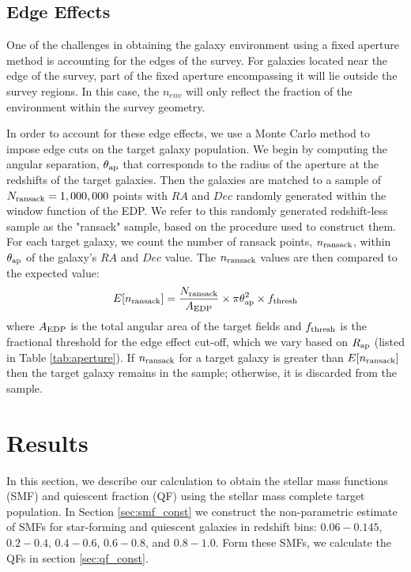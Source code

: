 \documentclass{emulateapj}
\begin{document}
\subsection{Edge Effects} \label{sec:edgeeffect}
One of the challenges in obtaining the galaxy environment using a fixed aperture method is accounting for the edges of the survey.
For galaxies located near the edge of the survey, part of the fixed aperture encompassing it will lie outside the survey regions. 
In this case, the $n_{env}$ will only reflect the fraction of the environment within the survey geometry.

In order to account for these edge effects, we use a Monte Carlo method to impose edge cuts on the target 
galaxy population. 
We begin by computing the angular separation, $\theta_{\rm{ap}}$ that corresponds to the radius of the 
aperture at the redshifts of the target galaxies.
Then the galaxies are matched to a sample of $N_{\rm{ransack}}=1,000,000$ points with $RA$ and $Dec$
 randomly generated within the window function of the EDP.  
We refer to this randomly generated redshift-less sample as the "ransack" sample, based on the procedure 
used to construct them. 
For each target galaxy, we count the number of ransack points, $n_{\rm{ransack}}$, within $\theta_{\rm{ap}}$
of the galaxy's $RA$ and $Dec$ value.
The $n_{\rm{ransack}}$ values are then compared to the expected value:
\begin{equation} \label{eq:ransack}
E[n_{\rm{ransack}}] = \frac{N_{\rm{ransack}}}{A_{\rm{EDP}}}\times {\pi \theta_{\rm{ap}}^2} \times f_{\rm{thresh}} 
\end{equation} 
where $A_{\rm{EDP}}$ is the total angular area of the target fields and $f_{\rm{thresh}}$ is the fractional 
threshold for the edge effect cut-off, which we vary based on $R_{\rm{ap}}$ (listed in Table \ref{tab:aperture}).
If $n_{\rm{ransack}}$ for a target galaxy is greater than $E[n_{\rm{ransack}}]$ then the target galaxy remains
in the sample; otherwise, it is discarded from the sample. 

\section{Results}
In this section, we describe our calculation to obtain the stellar mass functions (SMF) and quiescent fraction (QF) using the stellar mass complete target population.
In Section \ref{sec:smf_const} we construct the non-parametric estimate of SMFs for star-forming and quiescent galaxies in redshift bins: $0.06-0.145$, $0.2-0.4$, 
$0.4-0.6$, $0.6-0.8$, and $0.8-1.0$.
Form these SMFs, we calculate the QFs in section \ref{sec:qf_const}.
\end{document}
